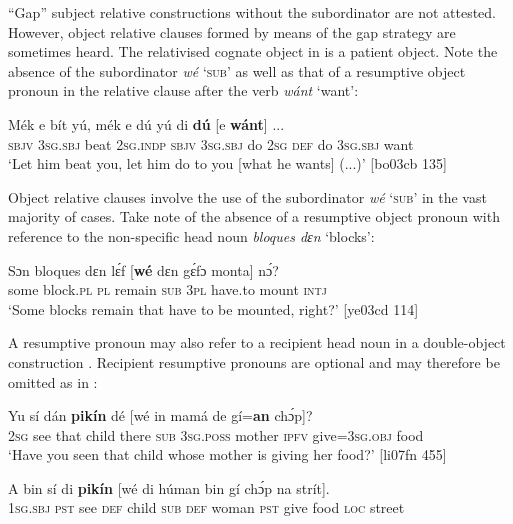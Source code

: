 “Gap” subject relative constructions without the subordinator are not attested. However, object relative clauses formed by means of the gap strategy are sometimes heard. The relativised cognate object in  is a patient object. Note the absence of the subordinator \textit{wé} ‘\textsc{sub}’ as well as that of a resumptive object pronoun in the relative clause after the verb \textit{wánt} ‘want’:


\ea%
    \label{ex:key:1433}
    \gll Mék    e    bít    yú,    mék    e    dú  yú  di  \textbf{dú}
[e    \textbf{wánt}]  \op...\cp{}\\
\textsc{sbjv}    \textsc{3sg.sbj}  beat    \textsc{2sg.indp}  \textsc{sbjv}    \textsc{3sg.sbj}  do  \textsc{2sg}  \textsc{def}  do
\phantom{[}\textsc{3sg.sbj}  want \\

\glt ‘Let him beat you, let him do to you [what he wants] (...)’ [bo03cb 135]
\z

Object relative clauses involve the use of the subordinator \textit{wé} ‘\textsc{sub}’ in the vast majority of cases. Take note of the absence of a resumptive object pronoun with reference to the non-specific head noun \textit{bloques dɛn} ‘blocks’: 


\ea%
    \label{ex:key:1434}
    \gll Sɔn    bloques  dɛn  lɛ́f    [\textbf{wé}  dɛn  gɛ́fɔ    monta]  nɔ́?\\
some  block.\textsc{pl}   \textsc{pl}  remain   \phantom{[}\textsc{sub}  \textsc{3pl}  have.to  mount  \textsc{intj}\\

\glt ‘Some blocks remain that have to be mounted, right?’ [ye03cd 114]
\z

A resumptive pronoun may also refer to a recipient head noun in a double-object construction . Recipient resumptive pronouns are optional and may therefore be omitted as in :


\ea%
    \label{ex:key:1435}
    \gll Yu  sí  dán  \textbf{pikín}  dé    [wé  in    mamá  de  gí=\textbf{an}    chɔ́p]?\\
\textsc{2sg}  see  that  child  there   \phantom{[}\textsc{sub}  \textsc{3sg.poss}  mother  \textsc{ipfv}  give=\textsc{3sg.obj}  food\\

\glt ‘Have you seen that child whose mother is giving her food?’ [li07fn 455]
\z


\ea%
    \label{ex:key:1436}
    \gll \MakeUppercase{A}   bin  sí  di  \textbf{pikín}  [wé  di  húman  bin  gí  chɔ́p  na  strít].\\
\textsc{1sg.sbj}  \textsc{pst}  see  \textsc{def}  child   \phantom{[}\textsc{sub}  \textsc{def}  woman  \textsc{pst}  give  food    \textsc{loc}  street\\

